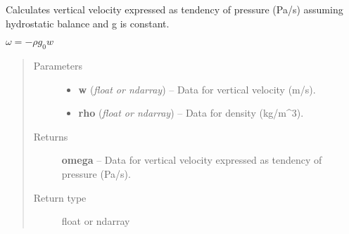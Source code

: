 \documentclass[letterpaper,10pt,english]{sphinxmanual}
\begin{document}

\begin{fulllineitems}
\label{atmos:atmos.equations.omega_from_w_rho_hydrostatic}
Calculates vertical velocity expressed as tendency of pressure (Pa/s) assuming
hydrostatic balance and g is constant.

\(\omega = - \rho g_0 w\)
\begin{quote}\begin{description}
\item[{Parameters}] \leavevmode\begin{itemize}
\item {} 
\textbf{w} (\emph{float or ndarray}) -- Data for vertical velocity (m/s).

\item {} 
\textbf{rho} (\emph{float or ndarray}) -- Data for density (kg/m\textasciicircum{}3).

\end{itemize}

\item[{Returns}] \leavevmode
\textbf{omega} --
Data for vertical velocity expressed as tendency of pressure (Pa/s).

\item[{Return type}] \leavevmode
float or ndarray

\end{description}\end{quote}

\end{fulllineitems}

\end{document}
